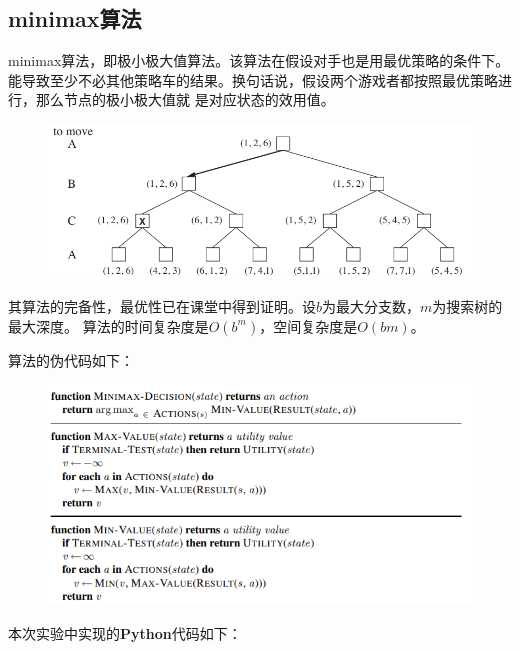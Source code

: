 \documentclass{ctexart}
\begin{document}
\subsection{\hei minimax算法}
minimax算法，即极小极大值算法。该算法在假设对手也是用最优策略的条件下。
能导致至少不必其他策略车的结果。换句话说，假设两个游戏者都按照最优策略进行，那么节点的极小极大值就
是对应状态的效用值。
\begin{figure}[htbp]	
	\centering	
	\includegraphics[scale=0.55]{mm.png}
		
\end{figure}
\par
其算法的完备性，最优性已在课堂中得到证明。设$b$为最大分支数，$m$为搜索树的最大深度。
算法的时间复杂度是$O\left(b^{m}\right)$，空间复杂度是$O\left(bm\right)$。
\par 算法的伪代码如下：
\begin{figure}[htbp]	
	\centering	
	\includegraphics[scale=0.45]{minimax.png}
		
\end{figure}
\par 本次实验中实现的\textbf{Python}代码如下：
\end{document}
